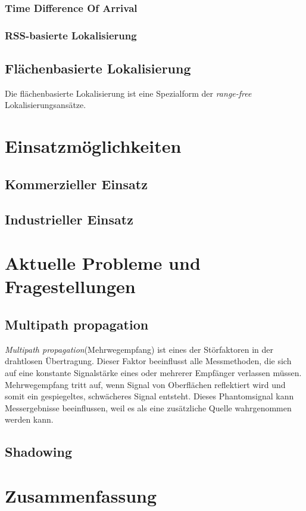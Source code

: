 \documentclass[12pt, a4wide]{scrreprt}
\begin{document}
    \subsection{Time Difference Of Arrival}
    \subsection{RSS-basierte Lokalisierung}    
  \section{Flächenbasierte Lokalisierung}
Die flächenbasierte Lokalisierung ist eine Spezialform der \textit{range-free} Lokalisierungsansätze.
\chapter{Einsatzmöglichkeiten}
  \section{Kommerzieller Einsatz}
  \section{Industrieller Einsatz}

\chapter{Aktuelle Probleme und Fragestellungen}
  \section{Multipath propagation}
\textit{Multipath propagation}(Mehrwegempfang) ist eines der Störfaktoren in der drahtlosen Übertragung. Dieser Faktor beeinflusst alle Messmethoden, die sich auf eine konstante Signalstärke eines oder mehrerer Empfänger verlassen müssen. Mehrwegempfang tritt auf, wenn Signal von Oberflächen reflektiert wird und somit ein gespiegeltes, schwächeres Signal entsteht. Dieses Phantomsignal kann Messergebnisse beeinflussen, weil es als eine zusätzliche Quelle wahrgenommen werden kann.
  \section{Shadowing}

\chapter{Zusammenfassung}

\newpage

\pagestyle{empty}

\nocite{*}
\end{document}
